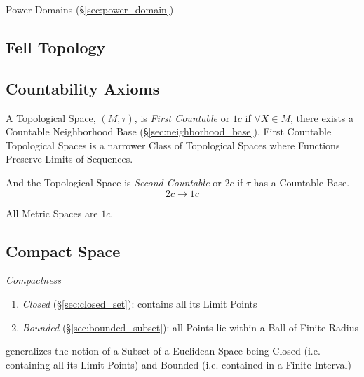 \fist Power Domains (\S\ref{sec:power_domain})



\subsection{Fell Topology}\label{sec:fell_topology}

\subsection{Countability Axioms}\label{sec:countability_axioms}

A Topological Space, $(M,\tau)$, is \emph{First Countable} or $1c$ if
$\forall X \in M$, there exists a Countable Neighborhood Base
(\S\ref{sec:neighborhood_base}). First Countable Topological Spaces is
a narrower Class of Topological Spaces where Functions Preserve Limits
of Sequences. %

And the Topological Space is \emph{Second Countable} or $2c$ if $\tau$
has a Countable Base.
\[
  2c \rightarrow 1c
\]

All Metric Spaces are $1c$.



\subsection{Compact Space}\label{sec:compact_space}

\emph{Compactness}

\begin{enumerate}
\item \emph{Closed} (\S\ref{sec:closed_set}): contains all its Limit Points
\item \emph{Bounded} (\S\ref{sec:bounded_subset}): all Points lie within a Ball
  of Finite Radius
\end{enumerate}

generalizes the notion of a Subset of a Euclidean Space being Closed
(i.e. containing all its Limit Points) and Bounded (i.e. contained in
a Finite Interval)

